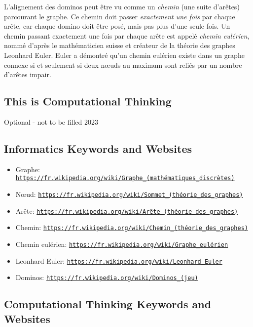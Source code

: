 \documentclass[a4paper,11pt]{report}
\newcommand{\BrochureUrlText}[1]{\texttt{#1}}
\begin{document}
L’alignement des dominos peut être vu comme un \emph{chemin} (une suite d’arêtes) parcourant le graphe. Ce chemin doit passer \emph{exactement une fois} par chaque arête, car chaque domino doit être posé, mais pas plus d’une seule fois. Un chemin passant exactement une fois par chaque arête est appelé \emph{chemin eulérien}, nommé d’après le mathématicien suisse et créateur de la théorie des graphes Leonhard Euler. Euler a démontré qu’un chemin eulérien existe dans un graphe connexe si et seulement si deux nœuds au maximum sont reliés par un nombre d’arêtes impair.


\subsection*{This is Computational Thinking}

Optional - not to be filled 2023


\subsection*{Informatics Keywords and Websites}

\begin{itemize}
  \item Graphe: \href{https://fr.wikipedia.org/wiki/Graphe_(math\%C3\%A9matiques_discr\%C3\%A8tes)}{\BrochureUrlText{https://fr.wikipedia.org/wiki/Graphe\_(mathématiques\_discrètes)}}
  \item Nœud: \href{https://fr.wikipedia.org/wiki/Sommet_(th\%C3\%A9orie_des_graphes)}{\BrochureUrlText{https://fr.wikipedia.org/wiki/Sommet\_(théorie\_des\_graphes)}}
  \item Arête: \href{https://fr.wikipedia.org/wiki/Ar\%C3\%AAte_(th\%C3\%A9orie_des_graphes)}{\BrochureUrlText{https://fr.wikipedia.org/wiki/Arête\_(théorie\_des\_graphes)}}
  \item Chemin: \href{https://fr.wikipedia.org/wiki/Chemin_(th\%C3\%A9orie_des_graphes)}{\BrochureUrlText{https://fr.wikipedia.org/wiki/Chemin\_(théorie\_des\_graphes)}}
  \item Chemin eulérien: \href{https://fr.wikipedia.org/wiki/Graphe_eul\%C3\%A9rien}{\BrochureUrlText{https://fr.wikipedia.org/wiki/Graphe\_eulérien}}
  \item Leonhard Euler: \href{https://fr.wikipedia.org/wiki/Leonhard_Euler}{\BrochureUrlText{https://fr.wikipedia.org/wiki/Leonhard\_Euler}}
  \item Dominos: \href{https://fr.wikipedia.org/wiki/Dominos_(jeu)}{\BrochureUrlText{https://fr.wikipedia.org/wiki/Dominos\_(jeu)}}
\end{itemize}


\subsection*{Computational Thinking Keywords and Websites}
\end{document}
